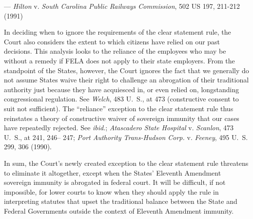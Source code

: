 \setupleglipsum
{---  \textit{Hilton} v. \textit{South Carolina Public Railways Commission}, 502 US 197, 211-212 (1991)}
{
In deciding when to ignore the requirements of the clear
statement rule, the Court also considers the extent to which
citizens have relied on our past decisions. This analysis
looks to the reliance of the employees who may be without a
remedy if FELA does not apply to their state employers.
From the standpoint of the States, however, the Court ignores
the fact that we generally do not assume States waive
their right to challenge an abrogation of their traditional authority
just because they have acquiesced in, or even relied 
on, longstanding congressional regulation. See \textit{Welch}, 483
U.~S., at 473 (constructive consent to suit not sufficient).
The “reliance” exception to the clear statement rule thus
reinstates a theory of constructive waiver of sovereign immunity
that our cases have repeatedly rejected. See \textit{ibid}.;
\textit{Atascadero State Hospital} v. \textit{Scanlon}, 473 U.~S., at 241, 246–
247; \textit{Port Authority Trans-Hudson Corp.} v. \textit{Feeney}, 495 U.~S.
299, 306 (1990).\par
In sum, the Court’s newly created exception to the clear
statement rule threatens to eliminate it altogether, except
when the States’ Eleventh Amendment sovereign immunity
is abrogated in federal court. It will be difficult, if not impossible,
for lower courts to know when they should apply
the rule in interpreting statutes that upset the traditional
balance between the State and Federal Governments outside
the context of Eleventh Amendment immunity.\par
}

